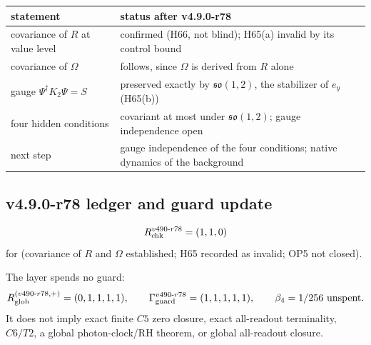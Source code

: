 \begin{center}
\small
\begin{tabular}{@{}>{\raggedright\arraybackslash}p{}>{\raggedright\arraybackslash}p{}@{}}
\toprule
statement & status after v4.9.0-r78\\
\midrule
covariance of \(R\) at value level & confirmed (H66, not blind); H65(a) invalid by its control bound\\
covariance of \(\Omega\) & follows, since \(\Omega\) is derived from \(R\) alone\\
gauge \(\Psi^\dagger K_2\Psi=S\) & preserved exactly by \(\mathfrak{so}(1,2)\), the stabilizer of \(e_y\) (H65(b))\\
four hidden conditions & covariant at most under \(\mathfrak{so}(1,2)\); gauge independence open\\
next step & gauge independence of the four conditions; native dynamics of the background\\
\bottomrule
\end{tabular}
\end{center}

\subsection*{v4.9.0-r78 ledger and guard update}
\label{subsec:v490-r78-ledger-guard}

\[
R_{\rm chk}^{v490\text{-}r78}=(1,1,0)
\]
for (covariance of \(R\) and \(\Omega\) established; H65 recorded as invalid; OP5 not closed).

The layer spends no guard:
\[
R_{\rm glob}^{(v490\text{-}r78,+)}=(0,1,1,1,1),
\qquad
\Gamma_{\rm guard}^{v490\text{-}r78}=(1,1,1,1,1),
\qquad
\beta_4=1/256\ \text{unspent}.
\]
It does not imply exact finite \(C5\) zero closure, exact all-readout terminality,
\(C6/T2\), a global photon-clock/RH theorem, or global all-readout closure.
